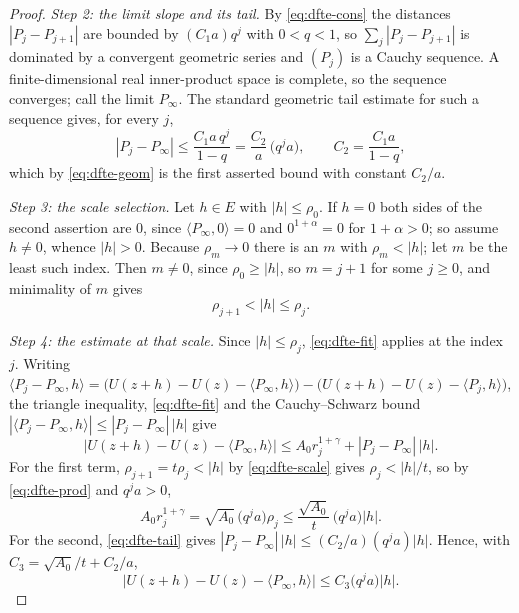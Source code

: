 \begin{proof}
\emph{Step 2: the limit slope and its tail.}
By \eqref{eq:dfte-cons} the distances $|P_j-P_{j+1}|$ are bounded by
$(C_1a)q^{j}$ with $0<q<1$, so $\sum_j|P_j-P_{j+1}|$ is dominated by a
convergent geometric series and $(P_j)$ is a Cauchy sequence. A
finite-dimensional real inner-product space is complete, so the sequence
converges; call the limit $P_\infty$. The standard geometric tail estimate for
such a sequence gives, for every $j$,
\begin{equation}\label{eq:dfte-tail}
  |P_j-P_\infty|\le\frac{C_1a\,q^{j}}{1-q}=\frac{C_2}{a}\,\bigl(q^{j}a\bigr),
  \qquad C_2=\frac{C_1a}{1-q},
\end{equation}
which by \eqref{eq:dfte-geom} is the first asserted bound with constant
$C_2/a$.

\emph{Step 3: the scale selection.}
Let $h\in E$ with $|h|\le\rho_0$. If $h=0$ both sides of the second assertion
are $0$, since $\langle P_\infty,0\rangle=0$ and $0^{1+\alpha}=0$ for
$1+\alpha>0$; so assume $h\ne0$, whence $|h|>0$. Because $\rho_m\to0$ there is
an $m$ with $\rho_m<|h|$; let $m$ be the least such index. Then $m\ne0$, since
$\rho_0\ge|h|$, so $m=j+1$ for some $j\ge0$, and minimality of $m$ gives
\begin{equation}\label{eq:dfte-scale}
  \rho_{j+1}<|h|\le\rho_j .
\end{equation}

\emph{Step 4: the estimate at that scale.}
Since $|h|\le\rho_j$, \eqref{eq:dfte-fit} applies at the index $j$. Writing
$\langle P_j-P_\infty,h\rangle=\bigl(U(z+h)-U(z)-\langle P_\infty,h\rangle\bigr)
-\bigl(U(z+h)-U(z)-\langle P_j,h\rangle\bigr)$, the triangle inequality,
\eqref{eq:dfte-fit} and the Cauchy--Schwarz bound
$|\langle P_j-P_\infty,h\rangle|\le|P_j-P_\infty|\,|h|$ give
\[
  \bigl|U(z+h)-U(z)-\langle P_\infty,h\rangle\bigr|
   \le A_0r_j^{1+\gamma}+|P_j-P_\infty|\,|h| .
\]
For the first term, $\rho_{j+1}=t\rho_j<|h|$ by \eqref{eq:dfte-scale} gives
$\rho_j<|h|/t$, so by \eqref{eq:dfte-prod} and $q^ja>0$,
\[
  A_0r_j^{1+\gamma}=\sqrt{A_0}\,\bigl(q^{j}a\bigr)\rho_j
   \le\frac{\sqrt{A_0}}{t}\,\bigl(q^{j}a\bigr)|h| .
\]
For the second, \eqref{eq:dfte-tail} gives
$|P_j-P_\infty|\,|h|\le(C_2/a)(q^{j}a)|h|$. Hence, with
$C_3=\sqrt{A_0}/t+C_2/a$,
\begin{equation}\label{eq:dfte-atscale}
  \bigl|U(z+h)-U(z)-\langle P_\infty,h\rangle\bigr|
   \le C_3\bigl(q^{j}a\bigr)|h| .
\end{equation}


\end{proof}
